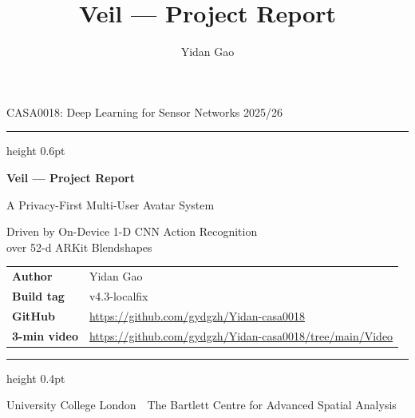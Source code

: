 \documentclass[11pt,a4paper]{article}
\title{Veil --- Project Report}
\author{Yidan Gao}
\date{}
\begin{document}
\begin{titlepage}
\thispagestyle{empty}
\vspace*{1.0cm}

\begin{flushleft}
\sffamily\small CASA0018: Deep Learning for Sensor Networks \hfill 2025/26
\end{flushleft}

\vspace{0.8cm}
\hrule height 0.6pt
\vspace{1.6cm}

\begin{center}
\sffamily
{\Huge\bfseries Veil --- Project Report\par}
\vspace{0.6cm}
{\LARGE A Privacy-First Multi-User Avatar System\par}
\vspace{0.4cm}
{\Large Driven by On-Device 1-D CNN Action Recognition\\[2pt]
over 52-d ARKit Blendshapes\par}
\end{center}

\vspace{2.2cm}

\begin{center}
\renewcommand{\arraystretch}{1.45}
\begin{tabularx}{0.86\textwidth}{@{}>{\sffamily\bfseries}l X@{}}
\toprule
Author      & Yidan Gao \\
Build tag   & v4.3-localfix \\
GitHub      & \href{https://github.com/gydgzh/Yidan-casa0018}{https://github.com/gydgzh/Yidan-casa0018} \\
3-min video & \href{https://github.com/gydgzh/Yidan-casa0018/tree/main/Video}{https://github.com/gydgzh/Yidan-casa0018/tree/main/Video} \\
\bottomrule
\end{tabularx}
\end{center}

\vfill

\hrule height 0.4pt
\vspace{0.4cm}
\begin{center}
\sffamily\small
University College London \,\textbar\, The Bartlett Centre for Advanced Spatial Analysis
\end{center}

\end{titlepage}
\end{document}
